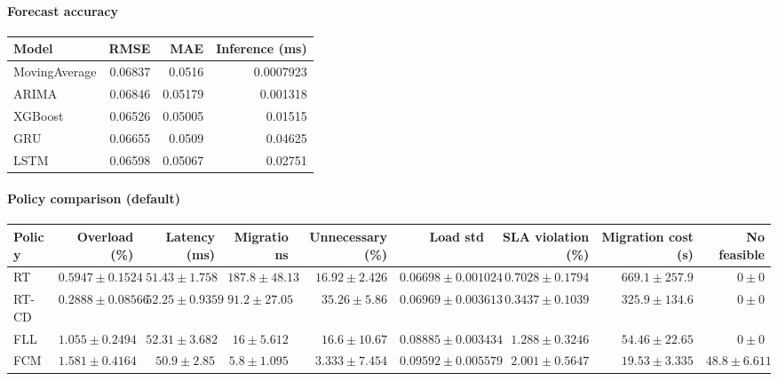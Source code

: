 \paragraph{Forecast accuracy}
\begin{tabular}{lrrr}
\hline
Model & RMSE & MAE & Inference (ms) \\
\hline
MovingAverage & 0.06837 & 0.0516 & 0.0007923 \\
ARIMA & 0.06846 & 0.05179 & 0.001318 \\
XGBoost & 0.06526 & 0.05005 & 0.01515 \\
GRU & 0.06655 & 0.0509 & 0.04625 \\
LSTM & 0.06598 & 0.05067 & 0.02751 \\
\hline
\end{tabular}


\paragraph{Policy comparison (default)}
\begin{tabular}{lrrrrrrrr}
\hline
Policy & Overload (\%) & Latency (ms) & Migrations & Unnecessary (\%) & Load std & SLA violation (\%) & Migration cost (s) & No feasible \\
\hline
RT & $0.5947 \pm 0.1524$ & $51.43 \pm 1.758$ & $187.8 \pm 48.13$ & $16.92 \pm 2.426$ & $0.06698 \pm 0.001024$ & $0.7028 \pm 0.1794$ & $669.1 \pm 257.9$ & $0 \pm 0$ \\
RT-CD & $0.2888 \pm 0.08566$ & $52.25 \pm 0.9359$ & $91.2 \pm 27.05$ & $35.26 \pm 5.86$ & $0.06969 \pm 0.003613$ & $0.3437 \pm 0.1039$ & $325.9 \pm 134.6$ & $0 \pm 0$ \\
FLL & $1.055 \pm 0.2494$ & $52.31 \pm 3.682$ & $16 \pm 5.612$ & $16.6 \pm 10.67$ & $0.08885 \pm 0.003434$ & $1.288 \pm 0.3246$ & $54.46 \pm 22.65$ & $0 \pm 0$ \\
FCM & $1.581 \pm 0.4164$ & $50.9 \pm 2.85$ & $5.8 \pm 1.095$ & $3.333 \pm 7.454$ & $0.09592 \pm 0.005579$ & $2.001 \pm 0.5647$ & $19.53 \pm 3.335$ & $48.8 \pm 6.611$ \\
\hline
\end{tabular}


